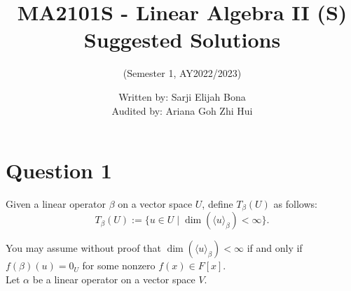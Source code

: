 \documentclass[12pt]{article}
\title{MA2101S - Linear Algebra II (S) Suggested Solutions}
\author{(Semester 1, AY2022/2023)}
\date{Written by: Sarji Elijah Bona\\ Audited by: Ariana Goh Zhi Hui
}
\begin{document}
\maketitle

\section*{Question 1}
Given a linear operator \(\beta\) on a vector space \(U\), define \(T_\beta(U)\) as follows:
\[
T_\beta(U) := \{ u \in U \mid \dim(\langle u \rangle_\beta) < \infty \}.
\]

\noindent You may assume without proof that \(\dim(\langle u \rangle_\beta) < \infty\) if and only if \(f(\beta)(u) = 0_U\) for some nonzero \(f(x) \in F[x]\). \\[0.5em]
\noindent Let \(\alpha\) be a linear operator on a vector space \(V\).
\end{document}
